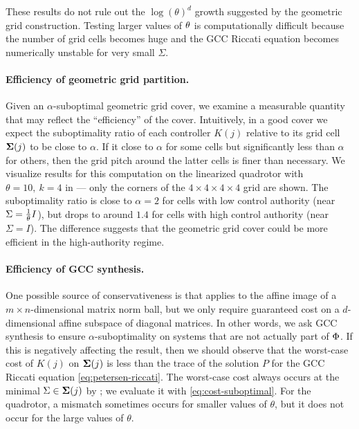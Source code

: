 These results do not rule out
the $\log(\theta)^d$ growth suggested by
the geometric grid construction.
Testing larger values of $\theta$
is computationally difficult because the number of grid cells becomes huge
and the GCC Riccati equation becomes numerically unstable for very small $\Sigma$.

\paragraph{Efficiency of geometric grid partition.}
\label{sec:are-geometric-efficient}

Given an $\alpha$-suboptimal geometric grid cover,
we examine a measurable quantity that may reflect the ``efficiency'' of the cover.
Intuitively,
in a good cover we expect 
the suboptimality ratio of each controller $K(j)$ relative to its grid cell $\boldsymbol\Sigma(j)$
to be close to $\alpha$.
If it close to $\alpha$ for some cells but significantly less than $\alpha$ for others,
then the grid pitch around the latter cells is finer than necessary.
We visualize results for this computation on the linearized quadrotor
with $\theta = 10,\ k = 4$
in 
---
only the corners of the $4 \times 4 \times 4 \times 4$ grid are shown.
The suboptimality ratio is close to $\alpha = 2$
for cells with low control authority (near $\Sigma = \frac{1}{\theta} I$),
but drops to around $1.4$
for cells with high control authority (near $\Sigma = I$).
The difference suggests that the geometric grid cover could be more efficient in the high-authority regime.

\paragraph{Efficiency of GCC synthesis.}
One possible source of conservativeness is that
 applies to the affine image of
a $m \times n$-dimensional matrix norm ball,
but we only require guaranteed cost on
a $d$-dimensional affine subspace of diagonal matrices.
In other words, we ask GCC synthesis to ensure $\alpha$-suboptimality on systems that are not actually part of $\Phi$.
If this is negatively affecting the result,
then we should observe that the worst-case cost of $K(j)$ on $\boldsymbol\Sigma(j)$
is less than the trace of the solution $P$ for the GCC Riccati equation \eqref{eq:petersen-riccati}.
The worst-case cost always occurs at the minimal $\Sigma \in \boldsymbol\Sigma(j)$ by ;
we evaluate it with \eqref{eq:cost-suboptimal}.
For the quadrotor,
a mismatch sometimes occurs for smaller values of $\theta$,
but it does not occur for the large values of $\theta$.

